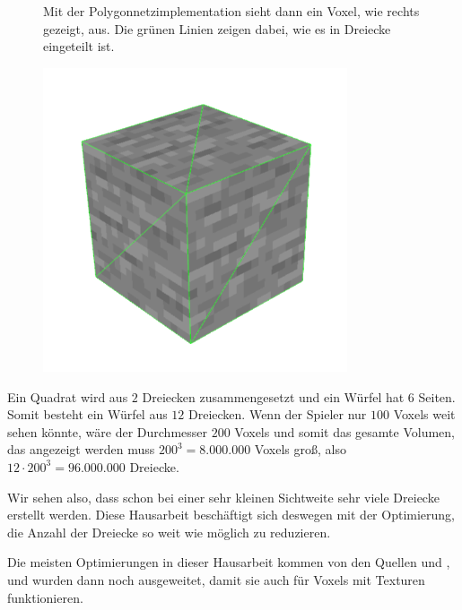 \begin{figure}[ht]
	\begin{minipage}[c]{0.48\textwidth}
Mit der Polygonnetzimplementation sieht dann ein
Voxel, wie rechts gezeigt, aus.
Die grünen Linien zeigen dabei, wie es in Dreiecke
eingeteilt ist.
	\end{minipage}
	\begin{minipage}[c]{0.5\textwidth}
		\begin{center}
\includegraphics[width=0.8\textwidth]{../assets/single_voxel.png}
		\end{center}
	\end{minipage}\hfill
\end{figure}

\goodbreak

Ein Quadrat wird aus $2$ Dreiecken zusammengesetzt
und ein Würfel hat $6$ Seiten. Somit besteht ein Würfel
aus $12$ Dreiecken. Wenn der Spieler nur $100$ Voxels
weit sehen könnte, wäre der Durchmesser $200$ Voxels
und somit das gesamte Volumen, das angezeigt werden
muss $200^3 = 8.000.000$ Voxels groß, also
$12 \cdot 200^3 = 96.000.000$ Dreiecke.

Wir sehen also, dass schon bei einer sehr kleinen
Sichtweite sehr viele Dreiecke erstellt werden.
Diese Hausarbeit beschäftigt sich deswegen mit der
Optimierung, die Anzahl der Dreiecke so weit wie
möglich zu reduzieren.

Die meisten Optimierungen in dieser Hausarbeit
kommen von den Quellen \cite{yt_bin_greedy_mesher}
und \cite{gh_bin_greedy_mesher}, und wurden dann
noch ausgeweitet, damit sie auch für
Voxels mit Texturen funktionieren.
